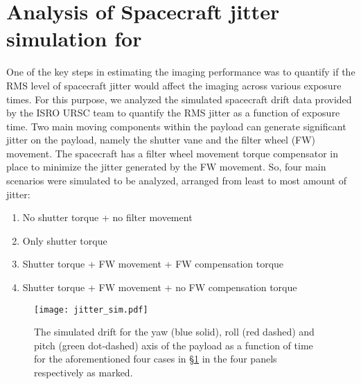 \section{Analysis of Spacecraft jitter simulation for {\suit}}\label{sec:suit_jitter}

One of the key steps in estimating the imaging performance was to quantify if the RMS level of spacecraft jitter would affect the imaging across various exposure times. For this purpose, we analyzed the simulated spacecraft drift data provided by the ISRO URSC team to quantify the RMS jitter as a function of exposure time. Two main moving components within the payload can generate significant jitter on the payload, namely the shutter vane and the filter wheel (FW) movement. The spacecraft has a filter wheel movement torque compensator in place to minimize the jitter generated by the FW movement. So, four main scenarios were simulated to be analyzed, arranged from least to most amount of jitter:

\begin{enumerate}
    \item No shutter torque + no filter movement
    \item Only shutter torque
    \item Shutter torque + FW movement + FW compensation torque
    \item Shutter torque + FW movement + no FW compensation torque
\end{enumerate}

\begin{figure}[ht!]
    \centering
    \texttt{[image: jitter\_sim.pdf]}
    \caption[Simulated drift for the yaw, roll and pitch axis as a function of time.]{The simulated drift for the yaw (blue solid), roll (red dashed) and pitch (green dot-dashed) axis of the payload as a function of time for the aforementioned four cases in \S\ref{sec:suit_jitter} in the four panels respectively as marked.}
    \label{fig:jitter_sim}
\end{figure}

